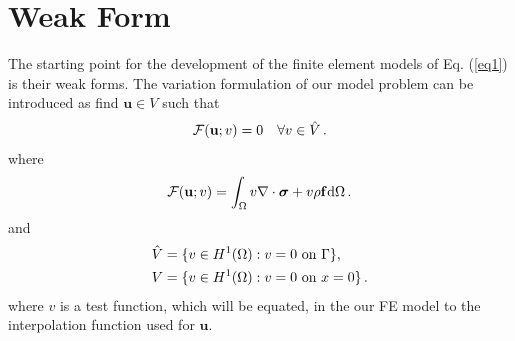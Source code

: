 \documentclass[]{article}
\begin{document}
\section{Weak Form} \label{sec: wf}
The starting point for the development of the finite element models of Eq. (\ref{eq1}) is their weak forms. The variation formulation of our model problem can be introduced as find $\mathbf{u} \in V$ such that
\begin{equation}\label{eq4}
	\begin{aligned}
		\mathcal{F}(\mathbf{u};v) = 0 \quad \forall v \in \hat{V}\thinspace.
	\end{aligned}
\end{equation}
where
\begin{equation}\label{eq5}
	\begin{aligned}
		\mathcal{F}(\mathbf{u}; v) =\int_{\Omega} v\nabla \cdot \boldsymbol{\sigma} + v \rho \mathbf{f}\mathrm{d}\Omega \thinspace .
	\end{aligned}
\end{equation}
and
\begin{equation}\label{eq6}
	\begin{aligned}
		\hat{V} &= \{v \in H^1(\Omega) : v = 0 \text{ on } \Gamma\}, \\
		V &= \{v \in H^1(\Omega) : v = 0 \text{ on } x=0\}\thinspace.
	\end{aligned}
\end{equation}
where $v$ is a test function, which will be equated, in the our FE model to the interpolation function used for $\mathbf{u}$.
\end{document}
